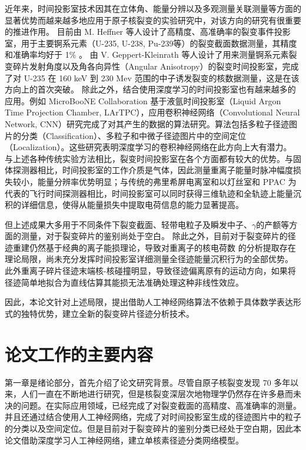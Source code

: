 \documentclass[AutoFakeBold]{LZUThesis}
\begin{document}
近年来，时间投影室技术因其在立体角、能量分辨以及多观测量关联测量等方面的显著优势而越来越多地应用于原子核裂变的实验研究中，对该方向的研究有很重要的推进作用。
目前由 M. Heffner 等人设计了高精度、高准确率的裂变事件投影室，用于主要锕系元素（U-235, U-238, Pu-239等）的裂变截面数据测量，其精度和准确率均好于 1\% \cite{heffner2014time}。
由 V. Geppert-Kleinrath 等人设计了用来测量锕系元素裂变碎片发射角度以及角各向异性（Angular Anisotropy）的裂变时间投影室，完成了对 U-235 在 160 keV 到 230 Mev 范围的中子诱发裂变的核数据测量，这是在该方向上的首次突破\cite{collaboration2019fission, hensle2020neutron}。
除此之外，结合使用深度学习的时间投影室也有越来越多的应用。例如 MicroBooNE Collaboration 基于液氩时间投影室（Liquid Argon Time Projection Chamber, LArTPC），应用卷积神经网络（Convolutional Neural Network, CNN）研究完成了对其产生的数据的算法研究。算法包括多粒子径迹图片的分类（Classification）、多粒子和中微子径迹图片中的空间定位（Localization）\cite{abratenko2020convolutional}。这些研究表明深度学习的卷积神经网络在此方向上大有潜力。
与上述各种传统实验方法相比，裂变时间投影室在各个方面都有较大的优势。与固体探测器相比，时间投影室的工作介质是气体，因此测量重离子能量时脉冲幅度损失较小，能量分辨率优势明显；与传统的弗里希屏电离室和以灯丝室和 PPAC 为代表的飞行时间探测器相比，时间投影室可以同时获得三维轨迹和全轨迹上能量沉积的详细信息，使得从能量损失中提取电荷信息的能力显著提高。

但上述成果大多用于不同条件下裂变截面、轻带电粒子及瞬发中子、$\gamma$的产额等方面的测量，对于裂变碎片的鉴别尚处于空白。
除此之外，目前对于裂变碎片的径迹重建仍然基于经典的离子能损理论，导致对重离子的核电荷数 的分析提取存在理论局限，尚未充分发挥时间投影室详细测量全径迹能量沉积行为的全部优势\cite{魏康2019基于GEM工艺的裂变时间投影室中裂变碎片的讨论}。
此外重离子碎片径迹末端核-核碰撞明显，导致径迹偏离原有的运动方向，如果将径迹简单地拟合为直线估算其能损无法准确处理这种非线性效应。

因此，本论文针对上述局限，提出借助人工神经网络算法不依赖于具体数学表达形式的独特优势，建立全新的裂变碎片径迹分析技术。






\section{论文工作的主要内容}
第一章是绪论部分，首先介绍了论文研究背景。尽管自原子核裂变发现 70 多年以来，人们一直在不断地进行研究，但是核裂变深层次地物理学仍然存在许多悬而未决的问题。在实际应用领域，已经完成了对裂变截面的高精度、高准确率的测量。并且还通过结合使用人工神经网络，完成了对时间投影室生成的径迹图片中的粒子的分类以及空间定位。但是目前对于裂变碎片的鉴别分类已经处于空白期，因此本论文借助深度学习人工神经网络，建立单核素径迹分类网络模型。
\end{document}
